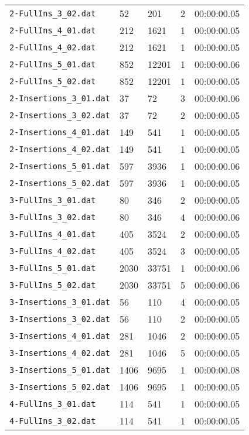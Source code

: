 \documentclass{article}
\begin{document}
\begin{table}
\begin{tabular}{y{3.6cm}x{1cm}x{1.5cm}x{1.5cm}y{1.5cm}}
    \verb|2-FullIns_3_02.dat| & 52 & 201 & 2 & 00:00:00.05 \\
    \verb|2-FullIns_4_01.dat| & 212 & 1621 & 1 & 00:00:00.05 \\
    \verb|2-FullIns_4_02.dat| & 212 & 1621 & 1 & 00:00:00.05 \\
    \verb|2-FullIns_5_01.dat| & 852 & 12201 & 1 & 00:00:00.06 \\
    \verb|2-FullIns_5_02.dat| & 852 & 12201 & 1 & 00:00:00.05 \\
    \verb|2-Insertions_3_01.dat| & 37 & 72 & 3 & 00:00:00.06 \\
    \verb|2-Insertions_3_02.dat| & 37 & 72 & 2 & 00:00:00.05 \\
    \verb|2-Insertions_4_01.dat| & 149 & 541 & 1 & 00:00:00.05 \\
    \verb|2-Insertions_4_02.dat| & 149 & 541 & 1 & 00:00:00.05 \\
    \verb|2-Insertions_5_01.dat| & 597 & 3936 & 1 & 00:00:00.06 \\
    \verb|2-Insertions_5_02.dat| & 597 & 3936 & 1 & 00:00:00.05 \\
    \verb|3-FullIns_3_01.dat| & 80 & 346 & 2 & 00:00:00.05 \\
    \verb|3-FullIns_3_02.dat| & 80 & 346 & 4 & 00:00:00.06 \\
    \verb|3-FullIns_4_01.dat| & 405 & 3524 & 2 & 00:00:00.05 \\
    \verb|3-FullIns_4_02.dat| & 405 & 3524 & 3 & 00:00:00.05 \\
    \verb|3-FullIns_5_01.dat| & 2030 & 33751 & 1 & 00:00:00.06 \\
    \verb|3-FullIns_5_02.dat| & 2030 & 33751 & 5 & 00:00:00.06 \\
    \verb|3-Insertions_3_01.dat| & 56 & 110 & 4 & 00:00:00.05 \\
    \verb|3-Insertions_3_02.dat| & 56 & 110 & 2 & 00:00:00.05 \\
    \verb|3-Insertions_4_01.dat| & 281 & 1046 & 2 & 00:00:00.05 \\
    \verb|3-Insertions_4_02.dat| & 281 & 1046 & 5 & 00:00:00.05 \\
    \verb|3-Insertions_5_01.dat| & 1406 & 9695 & 1 & 00:00:00.08 \\
    \verb|3-Insertions_5_02.dat| & 1406 & 9695 & 1 & 00:00:00.05 \\
    \verb|4-FullIns_3_01.dat| & 114 & 541 & 1 & 00:00:00.05 \\
    \verb|4-FullIns_3_02.dat| & 114 & 541 & 1 & 00:00:00.05 \\

\end{tabular}
\end{table}
\end{document}
